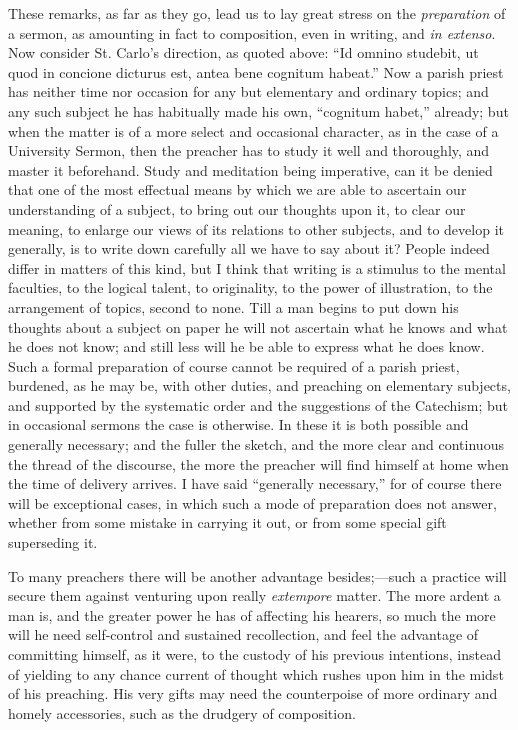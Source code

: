 These remarks, as far as they go, lead us to lay great stress on
the \emph{preparation} of a sermon, as amounting in fact to
composition, even in writing, and \emph{in extenso}. Now consider St.
Carlo's direction, as quoted above: ``Id omnino studebit, ut quod
in concione dicturus est, antea bene cognitum habeat.'' Now a
parish priest has neither time nor occasion for any but elementary and
ordinary topics; and any such subject he has habitually made his own,
``cognitum habet,'' already; but when the matter is of a more
select and occasional character, as in the case of a University
Sermon, then the preacher has to study it well and thoroughly, and
master it beforehand. Study and meditation being imperative, can
it be denied that one of the most effectual means by which we are able
to ascertain our understanding of a subject, to bring out our thoughts
upon it, to clear our meaning, to enlarge our views of its relations
to other subjects, and to develop it generally, is to write down
carefully all we have to say about it? People indeed differ in matters
of this kind, but I think that writing is a stimulus to the mental
faculties, to the logical talent, to originality, to the power of
illustration, to the arrangement of topics, second to none. Till a man
begins to put down his thoughts about a subject on paper he will not
ascertain what he knows and what he does not know; and still less will
he be able to express what he does know. Such a formal preparation of
course cannot be required of a parish priest, burdened, as he may be,
with other duties, and preaching on elementary subjects, and supported
by the systematic order and the suggestions of the Catechism; but in
occasional sermons the case is otherwise. In these it is both possible
and generally necessary; and the fuller the sketch, and the more clear
and continuous the thread of the discourse, the more the preacher will
find himself at home when the time of delivery arrives. I have said
``generally necessary,'' for of course there will be
exceptional cases, in which such a mode of preparation does not
answer, whether from some mistake in carrying it out, or from some
special gift superseding it.

To many preachers there will be another advantage besides;—such a
practice will secure them against venturing upon really \emph{extempore}
matter. The more ardent a man is, and the greater power he has of
affecting his hearers, so much the more will he need self-control and
sustained recollection, and feel the advantage of committing himself, as it were, to the custody of his previous intentions,
instead of yielding to any chance current of thought which rushes upon
him in the midst of his preaching. His very gifts may need the
counterpoise of more ordinary and homely accessories, such as the
drudgery of composition.

